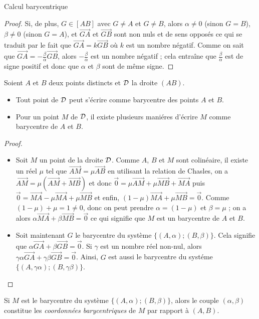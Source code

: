 \begin{chapter}{Calcul barycentrique}
\begin{prop}
\begin{proof}
		Si, de plus, $G \in [AB]$ avec $G \neq A$ et $G \neq B$, alors $\alpha \neq 0$ (sinon $G = B$), $\beta \neq 0$ (sinon $G = A$), et $\overrightarrow{GA}$ et $\overrightarrow{GB}$ 
		sont non nuls et de sens oppos\'es ce qui se traduit par le fait que 
		$\overrightarrow{GA} = k \overrightarrow{GB}$ o\`u $k$ est un nombre n\'egatif.
		Comme on sait que $\overrightarrow{GA} = - \frac{\beta}{\alpha} \overrightarrow{GB}$, 
		alors $- \frac{\beta}{\alpha}$ est un nombre n\'egatif ; cela entra\^ine que  
		$\frac{\beta}{\alpha}$ est de signe positif et donc que $\alpha$ et $\beta$ sont de m\^eme signe.
	\end{proof}
\end{prop}
%
\begin{prp}
	Soient $A$ et $B$ deux points distincts et $\mathcal{D}$ la droite $(AB)$.
	\begin{itemize} 
		\item Tout point de $\mathcal{D}$ peut s'\'ecrire comme barycentre des points $A$ et $B$.
		\item Pour un point $M$ de $\mathcal{D}$, il existe plusieurs mani\'eres d'\'ecrire $M$ comme barycentre de $A$ et $B$.
	\end{itemize}
	\begin{proof}
		\begin{itemize} 
		\item Soit $M$ un point de la droite $\mathcal{D}$.
			Comme $A$, $B$ et $M$ sont colin\'eaire, 
			il existe un r\'eel $\mu$ tel que $\overrightarrow{AM} = \mu \overrightarrow{AB}$
			en utilisant la relation de Chasles,
			on a $\overrightarrow{AM} = \mu (\overrightarrow{AM} + \overrightarrow{MB})$
			et donc $ \vec{0} = \mu \overrightarrow{AM} + \mu \overrightarrow{MB} + \overrightarrow{MA} $
			puis $\vec{0} = \overrightarrow{MA} - \mu \overrightarrow{MA} + \mu \overrightarrow{MB}$
			et enfin, $(1-\mu) \overrightarrow{MA} + \mu \overrightarrow{MB} = \vec{0}$.
			Comme $(1-\mu) + \mu = 1 \neq 0$, donc on peut prendre $\alpha = (1-\mu)$ et $\beta = \mu$ ; 
			on a alors $\alpha \overrightarrow{MA} + \beta \overrightarrow{MB} = \vec{0}$ 
			ce qui signifie que $M$ est un barycentre de $A$ et $B$.
		\item Soit maintenant $G$ le barycentre du syst\`eme $\{ (A,\alpha) ; (B,\beta) \}$.
			Cela signifie que $\alpha \overrightarrow{GA} + \beta \overrightarrow{GB} = \vec{0}$.
			Si $\gamma$ est un nombre r\'eel non-nul, 
			alors $\gamma \alpha \overrightarrow{GA} + \gamma \beta \overrightarrow{GB} = \vec{0}$.
			Ainsi, $G$ est aussi le barycentre du syst\'eme $\{ (A,\gamma \alpha) ; (B,\gamma \beta) \}$.
		\end{itemize}
	\end{proof}
\end{prp}
%
Si $M$ est le barycentre du syst\`eme $\{ (A, \alpha) ; (B, \beta) \}$, alors le couple $(\alpha,\beta)$ constitue les \emph{coordonn\'ees barycentriques} de $M$ par rapport \`a $(A,B)$.
%

\end{chapter}
